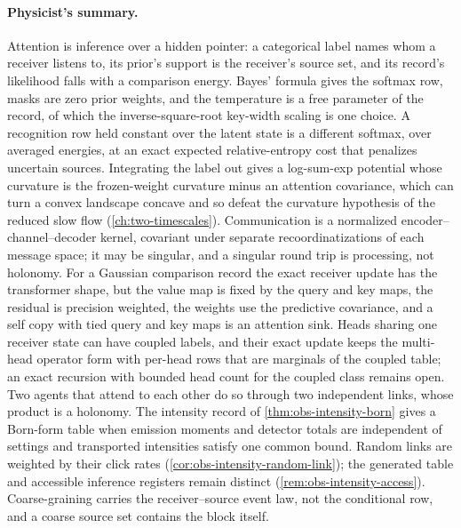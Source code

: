 \paragraph{Physicist's summary.}
Attention is inference over a hidden pointer: a categorical label names whom a
receiver listens to, its prior's support is the receiver's source set, and its
record's likelihood falls with a comparison energy. Bayes' formula gives the
softmax row, masks are zero prior weights, and the temperature is a free
parameter of the record, of which the inverse-square-root key-width scaling is
one choice. A recognition row held constant over the latent state is a
different softmax, over averaged energies, at an exact expected
relative-entropy cost that penalizes uncertain sources. Integrating the label
out gives a log-sum-exp potential whose curvature is the frozen-weight
curvature minus an attention covariance, which can turn a convex landscape
concave and so defeat the curvature hypothesis of the reduced slow flow
(\cref{ch:two-timescales}). Communication is a normalized encoder--channel--decoder kernel,
covariant under separate recoordinatizations of each message space; it may be
singular, and a singular round trip is processing, not holonomy. For a Gaussian
comparison record the exact receiver update has the transformer shape, but the
value map is fixed by the query and key maps, the residual is precision
weighted, the weights use the predictive covariance, and a self copy with tied
query and key maps is an attention sink. Heads sharing one receiver state can
have coupled labels, and their exact update keeps the multi-head operator form
with per-head rows that are marginals of the coupled table; an exact recursion
with bounded head count for the coupled class remains open. Two agents that
attend to each other do so through two independent links, whose product is a
holonomy.
The intensity record of \cref{thm:obs-intensity-born} gives a Born-form table
when emission moments and detector totals are independent of settings and
transported intensities satisfy one common bound. Random links are weighted
by their click rates (\cref{cor:obs-intensity-random-link}); the generated
table and accessible inference registers remain distinct
(\cref{rem:obs-intensity-access}).
Coarse-graining carries the receiver--source event law, not the conditional
row, and a coarse source set contains the block itself.
